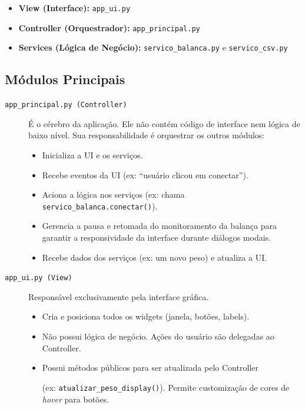 \documentclass[12pt,a4paper]{article}
\begin{document}
\begin{itemize}
    \item \textbf{View (Interface):} \texttt{app\_ui.py}
    \item \textbf{Controller (Orquestrador):} \texttt{app\_principal.py}
    \item \textbf{Services (Lógica de Negócio):} \texttt{servico\_balanca.py} e \texttt{servico\_csv.py}
\end{itemize}

\subsection{Módulos Principais}
\begin{description}
    \item[\texttt{app\_principal.py (Controller)}] É o cérebro da aplicação. Ele não contém código de interface nem lógica de baixo nível. Sua responsabilidade é orquestrar os outros módulos:
    \begin{itemize}
        \item Inicializa a UI e os serviços.
        \item Recebe eventos da UI (ex: ``usuário clicou em conectar'').
        \item Aciona a lógica nos serviços (ex: chama \texttt{servico\_balanca.conectar()}).
        \item Gerencia a pausa e retomada do monitoramento da balança para garantir a responsividade da interface durante diálogos modais.
        \item Recebe dados dos serviços (ex: um novo peso) e atualiza a UI.
    \end{itemize}

    \item[\texttt{app\_ui.py (View)}] Responsável exclusivamente pela interface gráfica.
    \begin{itemize}
        \item Cria e posiciona todos os widgets (janela, botões, labels).
        \item Não possui lógica de negócio. Ações do usuário são delegadas ao Controller.
        \item Possui métodos públicos para ser atualizada pelo Controller 
        
        (ex: \texttt{atualizar\_peso\_display()}). Permite customização de cores de \textit{hover} para botões.
    \end{itemize}


\end{description}
\end{document}
